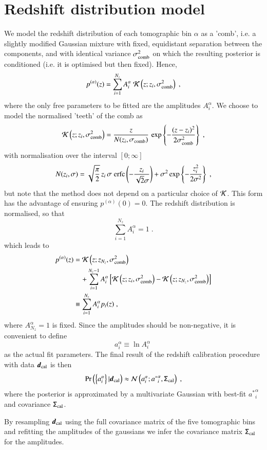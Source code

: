 \documentclass{aa}
\newcommand{\eq}[1]{\begin{equation}  #1 \end{equation}}
\newcommand{\eqa}[1]{\begin{align}   #1 \end{align}}
\newcommand{\br}[1]{\left( #1 \right)}
\newcommand{\bc}[1]{\left\{ #1 \right\}}
\newcommand{\bb}[1]{\left[ #1 \right]}
\newcommand{\nn}{\nonumber}
\newcommand{\pr}{{\rm Pr}}
\begin{document}
\section{Redshift distribution model}
\label{sec:redshift_distribution_model}
We model the redshift distribution of each tomographic bin $\alpha$ as a 'comb', i.e. a slightly modified Gaussian mixture with fixed, equidistant separation between the components, and with identical variance $\sigma_{\rm comb}^2$ on which the resulting posterior is conditioned (i.e. it is optimised but then fixed). Hence,
\eq{
p^{(\alpha)}(z) = \sum_{i=1}^{N_z} A_i^\alpha\; {\cal K}\br{z; z_i, \sigma_{\rm comb}^2}\;,
}
where the only free parameters to be fitted are the amplitudes $A_i^\alpha$. We choose to model the normalised 'teeth' of the comb as
\eq{
{\cal K} \br{z; z_i, \sigma_{\rm comb}^2} = \frac{z}{N(z_i, \sigma_{\rm comb})}\, \exp \bc{- \frac{(z-z_i)^2}{2 \sigma_{\rm comb}^2} }\;, 
}
with normalisation over the interval $\bb{0;\infty}$
\eq{
N(z_i, \sigma) = \sqrt{\frac{\pi}{2}}\, z_i\, \sigma\; {\rm erfc} \br{-\frac{z_i}{\sqrt{2} \sigma}} + \sigma^2 \exp \bc{-\frac{z_i^2}{2 \sigma^2}}\;,
}
but note that the method does not depend on a particular choice of ${\cal K}$. This form has the advantage of ensuring $p^{(\alpha)}(0)=0$. The redshift distribution is normalised, so that
\eq{
\sum_{i=1}^{N_z} A_i^\alpha = 1\;.
}
which leads to
\eqa{
p^{(\alpha)}(z) &= {\cal K}\br{z; z_{N_z}, \sigma_{\rm comb}^2} \\ \nn
& ~~~~+ \sum_{i=1}^{N_z-1} A_i^\alpha \bb{ {\cal K}\br{z; z_i, \sigma_{\rm comb}^2}  - {\cal K}\br{z; z_{N_z}, \sigma_{\rm comb}^2} } \\ \nn
&\equiv \sum_{i=1}^{N_z} A_i^\alpha p_i(z)\;,
}
where $A_{N_z}^\alpha =1$ is fixed. Since the amplitudes should be non-negative, it is convenient to define
\eq{
a_i^\alpha \equiv \ln A_i^\alpha\;
}
as the actual fit parameters. The final result of the redshift calibration procedure with data $\boldsymbol{d}_{\rm cal}$ is then
\eq{
\pr \br{ \bc{a_i^\alpha} | \boldsymbol{d}_{\rm cal}} \approx {\cal N}\br{ a_i^\alpha; {a^*}_i^\alpha, \tens{\Sigma}_{\rm cal}}\;,
}
where the posterior is approximated by a multivariate Gaussian with best-fit ${a^*}_i^\alpha$ and covariance $\mathsf{\Sigma}_{\rm cal}$.

By resampling $\boldsymbol{d}_{\rm cal}$ using the full covariance matrix of the five tomographic bins and refitting the amplitudes of the gaussians we infer the covariance matrix $\mathsf{\Sigma}_{\rm cal}$ for the amplitudes.
\end{document}
